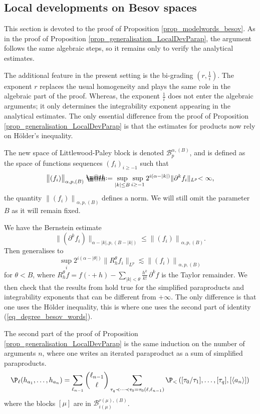 \documentclass[11pt]{preprint}
\makeatletter
\newcommand{\mcB}{\mathcal{B}}
\def\eqref#1{(\ref{#1})}
\newcommand*{\defeq}{\mathrel{\rlap{%
			\raisebox{0.3ex}{$\m@th\cdot$}}%
		\raisebox{-0.3ex}{$\m@th\cdot$}}%
	=}
\newcommand{\norme}[1]{\left\lVert #1 \right\lVert}
\makeatother
\begin{document}
\begin{appendix}
	\section{Local developments on Besov spaces}
	\label{Appendix_B}
	This section is devoted to the proof of Proposition \ref{prop_modelwords_besov}. As in the proof of Proposition \ref{prop_generalisation_LocalDevParap}, the argument follows the same algebraic steps, so it remains only to verify the analytical estimates.
	
The additional feature in the present setting is the bi-grading $(r,\frac{1}{i})$. The exponent $r$ replaces the usual homogeneity and plays the same role in the algebraic part of the proof. Whereas, the exponent $\frac{1}{i}$ does not enter the algebraic arguments; it only determines the integrability exponent appearing in the analytical estimates. 
The only essential difference from the proof of Proposition \ref{prop_generalisation_LocalDevParap} is that the estimates for products now rely on Hölder's inequality. 

	
	The new space of Littlewood-Paley block is denoted $\mcB_p^{\alpha , (B)}$, and is defined as the space of functions sequences $(f_i)_{i\geq -1}$ such that
		$$
		\big\lVert{(f_i)}\big\lVert_{\alpha,p,(B)} \defeq \sup_{|k| \leq B} \sup_{i\geq -1} 2^{i(\alpha-|k|)}\lVert \partial^k f_i \lVert_{L^p} < \infty,
		$$ 
		the quantity $\norme{(f_i)}_{\alpha,p,(B)}$ defines a norm. We will still omit the parameter $B$ as it will remain fixed. 
	
	We have the Bernstein estimate 
	$$	\big\lVert{(\partial^kf_i)}\big\lVert_{\alpha-|k|,p,(B-|k|)}\leq 	\norme{(f_i)}_{\alpha,p,(B)}.
	$$
	Then \cite[Lemma 3]{LocalExpansionsParacSystems} generalises to 
	$$
	\sup_i 2^{i(\alpha-|\theta|)} \big\lVert{R_h^\theta f_i}\big\lVert_{L^p} \lesssim 	\norme{(f_i)}_{\alpha,p,(B)}
	$$
	for $\theta<B$, where $R_h^\theta f=f(\cdot+h) - \sum_{|k|<\theta} \frac{h^k}{k!} \, \partial^kf $ is the Taylor remainder.  
	We then check that the results from \cite[Section 2]{LocalExpansionsParacSystems} hold true for the simplified paraproducts and integrability exponents that can be different from $+\infty$. The only difference is that one uses the Hölder inequality, this is where one uses the second part of identity \eqref{eq_degree_besov_words}. 
	
	The second part of the proof of Proposition \ref{prop_generalisation_LocalDevParap} is the same induction on the number of arguments $n$, where one writes an iterated paraproduct as a sum of simplified paraproducts. 
	$$
	\P_\ell(h_{a_1},\dots,h_{a_n}) = \sum_{\ell_{n-1}} { \ell_{n-1} \choose \ell  } \sum_{\tau_q\prec\dots\prec\tau_0 =\tau_0(\ell,\ell_{n-1}) } \P_< \left( [\tau_0/\tau_1 ] ,\dots,[\tau_q] , [\langle a_n \rangle]  \right)
	$$
	where the blocks $[\mu]$ are in $ \mcB_{i(\mu)}^{r(\mu) , (B)}$.
	

\end{appendix}
\end{document}
